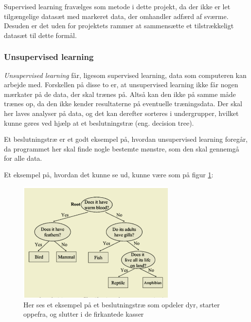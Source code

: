 Supervised learning fravælges som metode i dette projekt, da der ikke er let tilgængelige datasæt med markeret data, der omhandler adfærd af sværme. Desuden er det uden for projektets rammer at sammensætte et tilstrækkeligt datasæt til dette formål. 

\subsubsection{Unsupervised learning}
\textit{Unsupervised learning} får, ligesom supervised learning, data som computeren kan arbejde med. Forskellen på disse to er, at unsupervised learning ikke får nogen mærkater på de data, der skal trænes på. Altså kan den ikke på samme måde trænes op, da den ikke kender resultaterne på eventuelle træningsdata. Der skal her laves analyser på data, og det kan derefter sorteres i undergrupper, hvilket kunne gøres ved hjælp at et beslutningstræ (eng. decision tree). 
\par
Et beslutningstræ er et godt eksempel på, hvordan unsupervised learning foregår, da programmet her skal finde nogle bestemte mønstre, som den skal gennemgå for alle data. 
\par 
Et eksempel på, hvordan det kunne se ud, kunne være som på figur \ref{Beslutningstrae}:
\begin{figure}[H]
    \centering
    \includegraphics[width=0.7\textwidth]{figures/Beslutningstrae.png}
    \caption{Her ses et eksempel på et beslutningstræ som opdeler dyr, starter oppefra, og slutter i de firkantede kasser\cite{Bousquet2004}}
    \label{Beslutningstrae}
\end{figure}
\par

